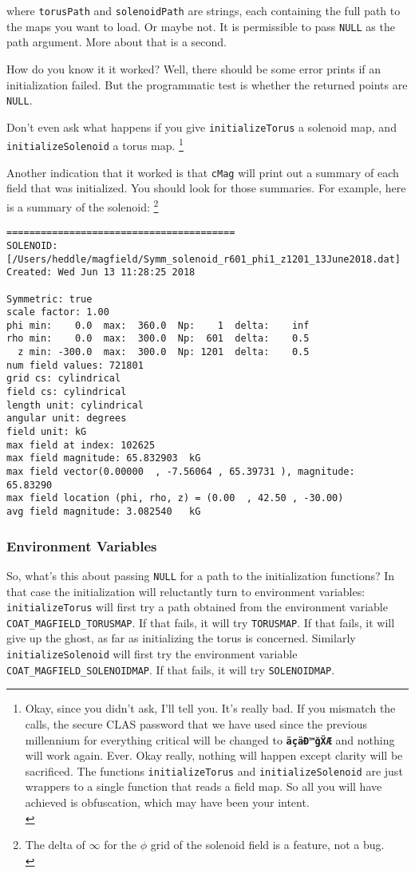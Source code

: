 \documentclass{article}
\begin{document}
where \texttt{torusPath} and \texttt{solenoidPath} are strings, each containing the full path to the maps you want to load. Or maybe not. It is permissible to pass \texttt{NULL} as the path argument. More about that is a second. 

How do you know it it worked? Well, there  should be some error prints if an initialization failed. But the programmatic test is whether the returned points are \texttt{NULL}. 

Don't even ask what happens if you give \texttt{initializeTorus} a solenoid map, and \texttt{initializeSolenoid}  a torus map. \footnote{Okay, since you didn't ask, I'll tell you. It's really bad. If you mismatch the calls, the secure CLAS password that we have used since the previous millennium for everything critical will be changed to \textbf{\texttt{äçäĐ™ǧẌÆ}} and nothing will work again. Ever. Okay really, nothing will happen except clarity will be sacrificed. The functions \texttt{initializeTorus} and \texttt{initializeSolenoid} are just wrappers to a single function that reads a field map. So all you will have achieved is obfuscation, which may have been your intent.\\}

Another indication that it worked is that \texttt{cMag} will print out a summary of each field that was initialized. You should look for those summaries. For example, here is a summary of the solenoid:
\footnote{The delta of $\infty$ for the $\phi$ grid of the solenoid field is a feature, not a bug.\\}

\begin{verbatim} 
========================================
SOLENOID: [/Users/heddle/magfield/Symm_solenoid_r601_phi1_z1201_13June2018.dat]
Created: Wed Jun 13 11:28:25 2018

Symmetric: true
scale factor: 1.00  
phi min:    0.0  max:  360.0  Np:    1  delta:    inf
rho min:    0.0  max:  300.0  Np:  601  delta:    0.5
  z min: -300.0  max:  300.0  Np: 1201  delta:    0.5
num field values: 721801
grid cs: cylindrical
field cs: cylindrical
length unit: cylindrical
angular unit: degrees
field unit: kG
max field at index: 102625
max field magnitude: 65.832903  kG
max field vector(0.00000  , -7.56064 , 65.39731 ), magnitude:     65.83290
max field location (phi, rho, z) = (0.00  , 42.50 , -30.00)
avg field magnitude: 3.082540   kG
\end{verbatim}

\subsubsection{Environment Variables}
So, what's this about passing \texttt{NULL} for a path to the initialization functions? In that case the initialization will reluctantly turn to environment variables: \texttt{initializeTorus}  will first try a path obtained from the environment variable \texttt{COAT\_MAGFIELD\_TORUSMAP}. If that fails, it will try \texttt{TORUSMAP}. If that fails, it will give up the ghost, as far as initializing the torus is concerned. Similarly \texttt{initializeSolenoid} will first try the environment variable \texttt{COAT\_MAGFIELD\_SOLENOIDMAP}. If that fails, it will try \texttt{SOLENOIDMAP}. 
\end{document}

